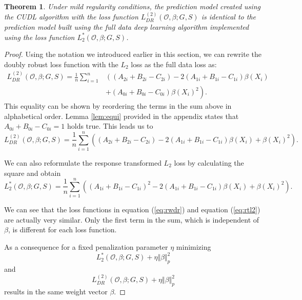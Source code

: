 \documentclass[12pt, a4paper]{article}
\theoremstyle{definition}
\theoremstyle{plain}
\newtheorem{Theorem}{Theorem}[section]
\numberwithin{equation}{section}
\numberwithin{figure}{section}
\numberwithin{table}{section}
\begin{document}
	\begin{Theorem}\label{thm:equi}
		Under mild regularity conditions, the prediction model created using the CUDL algorithm with the loss function $L_{DR}^{(2)}(\mathcal{O}, \beta; G,S)$ is identical to the prediction model built using the full data deep learning algorithm implemented using the loss function $L_2^*(\mathcal{O}, \beta; G,S)$.
	\end{Theorem}
	
	\begin{proof}
		Using the notation we introduced earlier in this section, we can rewrite the doubly robust loss function with the $L_2$ loss as the full data loss as:
		\begin{equation}\label{eq:rwdr}
		\begin{split}
		L_{DR}^{(2)}(\mathcal{O}, \beta; G,S) = \frac{1}{n} \sum_{i=1}^n & \left((A_{2i}+B_{2i}-C_{2i}) - 2(A_{1i}+B_{1i}-C_{1i})\beta(X_i) \right.\\
		& \left.+ (A_{0i}+B_{0i}-C_{0i})\beta(X_i)^2\right).
		\end{split}
		\end{equation}
		This equality can be shown by reordering the terms in the sum above in alphabetical order.
		Lemma \ref{lem:equi} provided in the appendix states that $A_{0i}+B_{0i}-C_{0i} = 1$ holds true.
		This leads us to
		\begin{equation*}
		L_{DR}^{(2)}(\mathcal{O}, \beta; G,S) = \frac{1}{n} \sum_{i=1}^n  \left((A_{2i}+B_{2i}-C_{2i}) - 2(A_{1i}+B_{1i}-C_{1i})\beta(X_i) + \beta(X_i)^2\right).
		\end{equation*}
		
		We can also reformulate the response transformed $L_2$ loss by calculating the square and obtain
		\begin{equation}\label{eq:rtl2}
		L_2^*(\mathcal{O}, \beta; G,S) = \frac{1}{n} \sum_{i=1}^n \left((A_{1i}+B_{1i}-C_{1i})^2 - 2 (A_{1i}+B_{1i}-C_{1i}) \beta(X_i)+\beta(X_i)^2\right).
		\end{equation}
		
		We can see that the loss functions in equation (\ref{eq:rwdr}) and equation (\ref{eq:rtl2}) are actually very similar.
		Only the first term in the sum, which is independent of $\beta$, is different for each loss function.
	
		As a consequence for a fixed penalization parameter $\eta$ minimizing 
		\begin{equation*}
		L_2^*(\mathcal{O}, \beta; G,S) + \eta \Vert \beta \Vert_p^2
		\end{equation*}
		and 
		\begin{equation*}
		L_{DR}^{(2)}(\mathcal{O}, \beta; G,S) + \eta \Vert \beta \Vert_p^2
		\end{equation*}
		 results in the same weight vector $\beta$.
		 

\end{proof}
\end{document}
